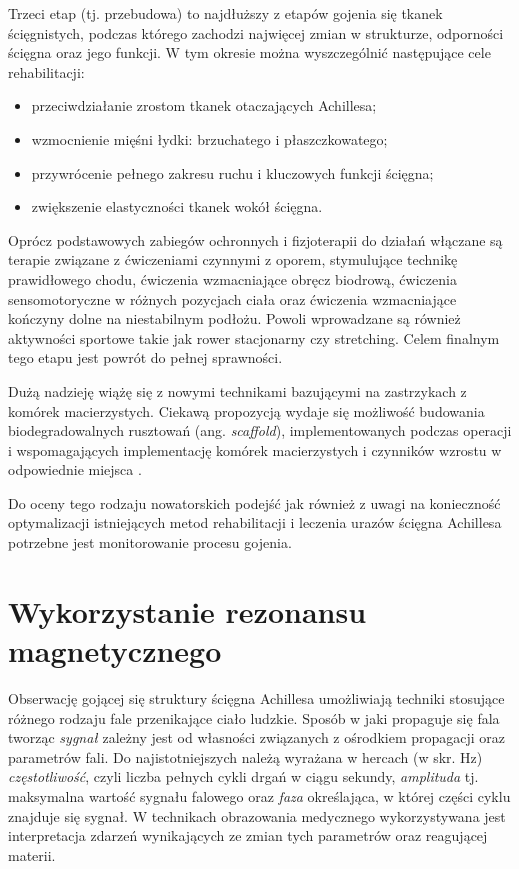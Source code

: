 Trzeci etap (tj. przebudowa) to najdłuższy z etapów gojenia się tkanek ścięgnistych, podczas którego zachodzi najwięcej zmian w strukturze, odporności ścięgna oraz jego funkcji. W tym okresie można wyszczególnić następujące cele rehabilitacji: 
\begin{itemize}
	\item przeciwdziałanie zrostom tkanek otaczających Achillesa; 
	\item wzmocnienie mięśni łydki: brzuchatego i płaszczkowatego; 
	\item przywrócenie pełnego zakresu ruchu i kluczowych funkcji ścięgna; 
	\item zwiększenie elastyczności tkanek wokół ścięgna.
\end{itemize}

Oprócz podstawowych zabiegów ochronnych i fizjoterapii do działań włączane są terapie związane z ćwiczeniami czynnymi z oporem, stymulujące technikę prawidłowego chodu, ćwiczenia wzmacniające obręcz biodrową, ćwiczenia sensomotoryczne w różnych pozycjach ciała oraz ćwiczenia wzmacniające kończyny dolne na niestabilnym podłożu. Powoli wprowadzane są również aktywności sportowe takie jak rower stacjonarny czy stretching. Celem finalnym tego etapu jest powrót do pełnej sprawności. 

Dużą nadzieję wiążę się z nowymi technikami bazującymi na zastrzykach z komórek macierzystych. Ciekawą propozycją wydaje się możliwość budowania biodegradowalnych rusztowań (ang. \textit{scaffold}), implementowanych podczas operacji i wspomagających implementację komórek macierzystych i czynników wzrostu w odpowiednie miejsca \cite{START}.

Do oceny tego rodzaju nowatorskich podejść jak również z uwagi na konieczność optymalizacji istniejących metod rehabilitacji i leczenia urazów ścięgna Achillesa potrzebne jest monitorowanie procesu gojenia. 

\section{Wykorzystanie rezonansu magnetycznego}
\label{RM}
Obserwację gojącej się struktury ścięgna Achillesa umożliwiają techniki stosujące różnego rodzaju fale przenikające ciało ludzkie. Sposób w jaki propaguje się fala tworząc \textit{sygnał} zależny jest od własności związanych z ośrodkiem propagacji oraz parametrów fali. Do najistotniejszych należą wyrażana w hercach (w skr. Hz) \textit{częstotliwość}, czyli liczba pełnych cykli drgań w ciągu sekundy, \textit{amplituda} tj. maksymalna wartość sygnału falowego oraz \textit{faza} określająca, w której części cyklu znajduje się sygnał. W technikach obrazowania medycznego wykorzystywana jest interpretacja zdarzeń wynikających ze zmian tych parametrów oraz reagującej materii.

